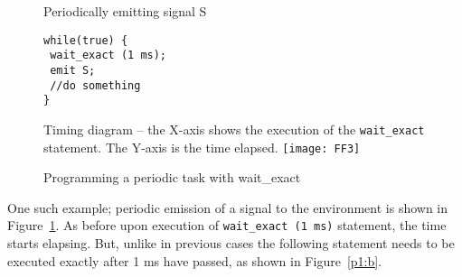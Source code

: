 \begin{figure}[t!]
  \centering
	\vspace{-10pt}
        \begin{SubFloat}{\label{pp:a}Periodically emitting signal S}
        \begin{lstlisting}[style=sysj,morekeywords={emit,trap,pause,exit,wait_exact}]
while(true) { 
 wait_exact (1 ms); 
 emit S; 
 //do something 
}
\end{lstlisting}
\end{SubFloat}

\begin{SubFloat}{\label{p1:b}Timing diagram -- the X-axis shows the
    execution of the \texttt{wait\_exact} statement. The Y-axis is the
    time elapsed.}
  \texttt{[image: FF3]}
\end{SubFloat}
  \caption{Programming a periodic task with wait\_exact}
  \label{fig:p1}
  \vspace{-10pt}
\end{figure}

One such example; periodic emission of a signal to the environment is
shown in Figure~\ref{fig:p1}. As before upon execution of
\texttt{wait\_exact (1 ms)} statement, the time starts elapsing. But,
unlike in previous cases the following statement needs to be executed
exactly after 1 ms have passed, as shown in Figure~\ref{p1:b}.

